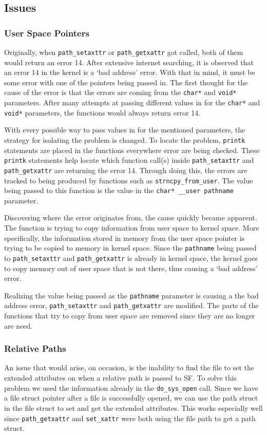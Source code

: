 \subsection{Issues}

\subsubsection*{User Space Pointers}

Originally, when \texttt{path\_setaxttr} or \texttt{path\_getxattr} got called, both of them would return an error 14. After extensive internet searching, it is observed that an error 14 in the kernel is a `bad address' error. With that in mind, it must be some error with one of the pointers being passed in. The first thought for the cause of the error is that the errors are coming from the \texttt{char*} and \texttt{void*} parameters. After many attempts at passing different values in for the \texttt{char*} and \texttt{void*} parameters, the functions would always return error 14. 

With every possible way to pass values in for the mentioned parameters, the strategy for isolating the problem is changed. To locate the problem, \texttt{printk} statements are placed in the functions everywhere error are being checked. These \texttt{printk} statements help locate which function call(s) inside \texttt{path\_setaxttr} and \texttt{path\_getxattr} are returning the error 14. Through doing this, the errors are tracked to being produced by functions such as \texttt{strncpy\_from\_user}. The value being passed to this function is the value in the \texttt{char* \_\_user pathname} parameter. 

Discovering where the error originates from, the cause quickly became apparent. The function is trying to copy information from user space to kernel space. More specifically, the information stored in memory from the user space pointer is trying to be copied to memory in kernel space. Since the \texttt{pathname} being passed to \texttt{path\_setaxttr} and \texttt{path\_getxattr} is already in kernel space, the kernel goes to copy memory out of user space that is not there, thus causing a `bad address' error.

Realizing the value being passed as the \texttt{pathname} parameter is causing a the bad address error, \texttt{path\_setaxttr} and \texttt{path\_getxattr} are modified. The parts of the functions that try to copy from user space are removed since they are no longer are need.

\subsubsection*{Relative Paths}

An issue that would arise, on occasion, is the inability to find the file to set the extended attributes on when a relative path is passed to SF. To solve this problem we used the information already in the \texttt{do\_sys\_open} call. Since we have a file struct pointer after a file is successfully opened, we can use the path struct in the file struct to set and get the extended attributes. This works especially well since \texttt{path\_getxattr} and \texttt{set\_xattr} were both using the file path to get a path struct.